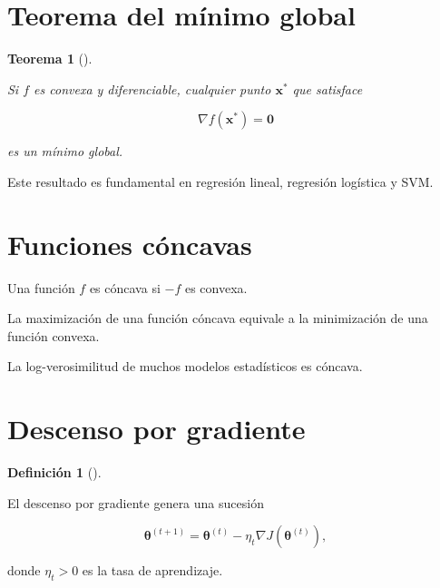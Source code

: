 \documentclass[
  spanish,
  10.5pt,
  letterpaper,
  DIV=11,
  numbers=noendperiod,
  oneside,
  open=any]{scrreprt}
\theoremstyle{definition}
\newtheorem{definition}{Definición}[chapter]
\theoremstyle{definition}
\theoremstyle{plain}
\newtheorem{theorem}{Teorema}[chapter]
\theoremstyle{remark}
\begin{document}
\section*{Teorema del mínimo global}\label{teorema-del-muxednimo-global}


\begin{theorem}[]\protect\hypertarget{thm-minimo-global-convexo}{}\label{thm-minimo-global-convexo}

Si \(f\) es convexa y diferenciable, cualquier punto \(\mathbf{x}^{*}\)
que satisface

\[
\nabla f(\mathbf{x}^{*})=\mathbf{0}
\]

es un mínimo global.

\end{theorem}

Este resultado es fundamental en regresión lineal, regresión logística y
SVM.

\section*{Funciones cóncavas}\label{funciones-cuxf3ncavas}


Una función \(f\) es cóncava si \(-f\) es convexa.

La maximización de una función cóncava equivale a la minimización de una
función convexa.

La log-verosimilitud de muchos modelos estadísticos es cóncava.

\section*{Descenso por gradiente}\label{descenso-por-gradiente}


\begin{definition}[]\protect\hypertarget{def-descenso-gradiente}{}\label{def-descenso-gradiente}

El descenso por gradiente genera una sucesión

\[
\boldsymbol{\theta}^{(t+1)}
=
\boldsymbol{\theta}^{(t)}
-
\eta_t
\nabla J(
\boldsymbol{\theta}^{(t)}
),
\]

donde \(\eta_t>0\) es la tasa de aprendizaje.

\end{definition}
\end{document}
